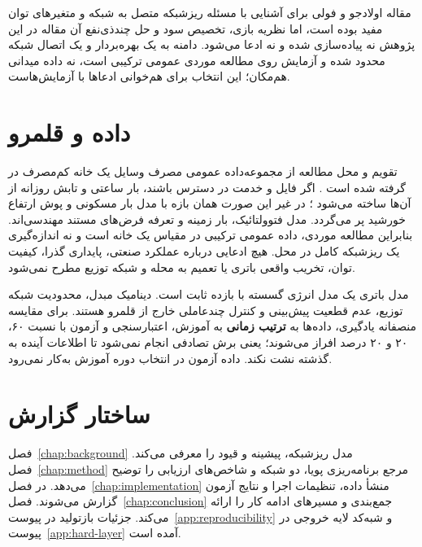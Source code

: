 مقاله اولادجو و فولی  برای آشنایی با مسئله ریزشبکه متصل به شبکه و متغیرهای توان مفید بوده است، اما نظریه بازی، تخصیص سود و حل چندذی‌نفع آن مقاله در این پژوهش نه پیاده‌سازی شده و نه ادعا می‌شود. دامنه به یک بهره‌بردار و یک اتصال شبکه محدود شده و آزمایش روی مطالعه موردی عمومی ترکیبی است، نه داده میدانی هم‌مکان؛ این انتخاب برای هم‌خوانی ادعاها با آزمایش‌هاست.

\section{داده و قلمرو}
تقویم و محل مطالعه از مجموعه‌داده عمومی مصرف وسایل یک خانه کم‌مصرف در  گرفته شده است . اگر فایل  و خدمت  در دسترس باشند، بار ساعتی و تابش روزانه از آن‌ها ساخته می‌شود ؛ در غیر این صورت همان بازه با مدل بار مسکونی و پوش ارتفاع خورشید پر می‌گردد. مدل فتوولتائیک، بار زمینه و تعرفه فرض‌های مستند مهندسی‌اند. بنابراین مطالعه موردی، داده عمومی ترکیبی در مقیاس یک خانه است و نه اندازه‌گیری یک ریزشبکه کامل در محل. هیچ ادعایی درباره عملکرد صنعتی، پایداری گذرا، کیفیت توان، تخریب واقعی باتری یا تعمیم به محله و شبکه توزیع مطرح نمی‌شود.

مدل باتری یک مدل انرژی گسسته با بازده ثابت است. دینامیک مبدل، محدودیت شبکه توزیع، عدم قطعیت پیش‌بینی و کنترل چندعاملی خارج از قلمرو هستند. برای مقایسه منصفانه یادگیری، داده‌ها به \textbf{ترتیب زمانی} به آموزش، اعتبارسنجی و آزمون با نسبت ۶۰، ۲۰ و ۲۰ درصد افراز می‌شوند؛ یعنی برش تصادفی انجام نمی‌شود تا اطلاعات آینده به گذشته نشت نکند. داده آزمون در انتخاب دوره آموزش به‌کار نمی‌رود.

\section{ساختار گزارش}
فصل~\ref{chap:background} مدل ریزشبکه، پیشینه و قیود را معرفی می‌کند. فصل~\ref{chap:method} مرجع برنامه‌ریزی پویا، دو شبکه و شاخص‌های ارزیابی را توضیح می‌دهد. در فصل~\ref{chap:implementation} منشأ داده، تنظیمات اجرا و نتایج آزمون گزارش می‌شوند. فصل~\ref{chap:conclusion} جمع‌بندی و مسیرهای ادامه کار را ارائه می‌کند. جزئیات بازتولید در پیوست~\ref{app:reproducibility} و شبه‌کد لایه خروجی در پیوست~\ref{app:hard-layer} آمده است.
